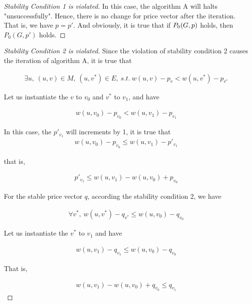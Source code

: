 \documentclass[11pt,a4paper]{article}
\begin{document}
\begin{proof}[Stability Condition 1 is violated]
    In this case, the algorithm A will halts "unsuccessfully". Hence, there is
    no change for price vector after the iteration. That is, we have $p = p'$.
    And obviously, it is true that if $P_0(G, p)$ holds, then $P_0(G, p')$ holds.
\end{proof}

\begin{proof}[Stability Condition 2 is violated]
    Since the violation of stability condition 2 causes the iteration of
    algorithm A, it is true that 
    
    \begin{align}
        \exists u,\ (u, v) \in M,\ (u, v^*) \in E,\ s.t.\ 
        w(u, v) - p_{v} < w(u, v^*) - p_{v^*}
    \end{align}
    
    Let us instantiate the $v$ to $v_0$ and $v^*$ to $v_1$, and have
    
    \begin{align}
        w(u, v_0) - p_{v_0} < w(u, v_1) - p_{v_1}
    \end{align}

    In this case, the $p'_{v_1}$ will increments by 1, it is true that
    \begin{align}
        w(u, v_0) - p_{v_0} \leq w(u, v_1) - p'_{v_1}
    \end{align}

    that is,

    \begin{align} \label{ex2:p_v_1leqbala}
         p'_{v_1} \leq w(u, v_1) - w(u, v_0) + p_{v_0}
    \end{align}

    For the stable price vector $q$, according the stability condition 2, we
    have 

    \begin{align}
        \forall v^{*},\ w(u, v^{*}) - q_{v^{*}} \leq w(u, v_0) - q_{v_0}    
    \end{align}

    Let us instantiate the $v^{*}$ to $v_1$ and have

    \begin{align}
        w(u, v_1) - q_{v_1} \leq w(u, v_0) - q_{v_0}
    \end{align}

    That is, 

    \begin{align}
        w(u, v_1) - w(u, v_0) + q_{v_0} \leq q_{v_1}
    \end{align}


\end{proof}
\end{document}
